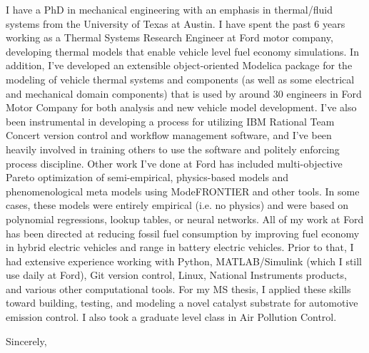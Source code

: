 \documentclass[11pt]{letter} %
\begin{document}
\begin{letter}{}
\opening{} I have a PhD in mechanical engineering with an emphasis in
thermal/fluid systems from the University of Texas at Austin.  I have
spent the past 6 years working as a Thermal Systems Research Engineer
at Ford motor company, developing thermal models that enable vehicle
level fuel economy simulations.  In addition, I've developed an
extensible object-oriented Modelica package for the modeling of
vehicle thermal systems and components (as well as some electrical and
mechanical domain components) that is used by around 30 engineers in
Ford Motor Company for both analysis and new vehicle model
development.  I've also been instrumental in developing a process for
utilizing IBM Rational Team Concert version control and workflow
management software, and I've been heavily involved in training others
to use the software and politely enforcing process discipline.  Other
work I've done at Ford has included multi-objective Pareto
optimization of semi-empirical, physics-based models and
phenomenological meta models using ModeFRONTIER and other tools.  In
some cases, these models were entirely empirical (i.e. no physics) and
were based on polynomial regressions, lookup tables, or neural
networks.  All of my work at Ford has been directed at reducing fossil
fuel consumption by improving fuel economy in hybrid electric vehicles
and range in battery electric vehicles.  Prior to that, I had
extensive experience working with Python, MATLAB/Simulink (which I
still use daily at Ford), Git version control, Linux, National
Instruments products, and various other computational tools.  For my
MS thesis, I applied these skills toward building, testing, and
modeling a novel catalyst substrate for automotive emission control.
I also took a graduate level class in Air Pollution Control.

\closing{Sincerely,}




\end{letter}
\end{document}
